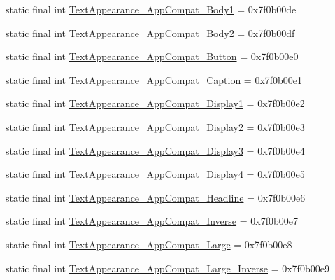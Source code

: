 \begin{CompactItemize}
\item 
static final int \hyperlink{classandroid_1_1support_1_1v7_1_1appcompat_1_1_r_1_1style_18b988d938e04ae554b3a6dcb6e4c5c8}{TextAppearance\_\-AppCompat\_\-Body1} = 0x7f0b00de
\item 
static final int \hyperlink{classandroid_1_1support_1_1v7_1_1appcompat_1_1_r_1_1style_960ce2ad432f380456d09bc9cc343480}{TextAppearance\_\-AppCompat\_\-Body2} = 0x7f0b00df
\item 
static final int \hyperlink{classandroid_1_1support_1_1v7_1_1appcompat_1_1_r_1_1style_65f6be220e2bd8dd56d1edef2449e1f1}{TextAppearance\_\-AppCompat\_\-Button} = 0x7f0b00e0
\item 
static final int \hyperlink{classandroid_1_1support_1_1v7_1_1appcompat_1_1_r_1_1style_169789ec782d3aeadbcd1aedf96d27fc}{TextAppearance\_\-AppCompat\_\-Caption} = 0x7f0b00e1
\item 
static final int \hyperlink{classandroid_1_1support_1_1v7_1_1appcompat_1_1_r_1_1style_a3b2cd207d097a2f103f44934556acff}{TextAppearance\_\-AppCompat\_\-Display1} = 0x7f0b00e2
\item 
static final int \hyperlink{classandroid_1_1support_1_1v7_1_1appcompat_1_1_r_1_1style_ee46973c484e2a0b2f1cc1bd26f35d1c}{TextAppearance\_\-AppCompat\_\-Display2} = 0x7f0b00e3
\item 
static final int \hyperlink{classandroid_1_1support_1_1v7_1_1appcompat_1_1_r_1_1style_fbc83361a2f279b07b1fc1ac1db887dc}{TextAppearance\_\-AppCompat\_\-Display3} = 0x7f0b00e4
\item 
static final int \hyperlink{classandroid_1_1support_1_1v7_1_1appcompat_1_1_r_1_1style_9c89fd6aa3594980e46ce6cde89d833b}{TextAppearance\_\-AppCompat\_\-Display4} = 0x7f0b00e5
\item 
static final int \hyperlink{classandroid_1_1support_1_1v7_1_1appcompat_1_1_r_1_1style_35918121f36dafc7c4d8365e83da9434}{TextAppearance\_\-AppCompat\_\-Headline} = 0x7f0b00e6
\item 
static final int \hyperlink{classandroid_1_1support_1_1v7_1_1appcompat_1_1_r_1_1style_95314431799de7aff7015b24dd7156c3}{TextAppearance\_\-AppCompat\_\-Inverse} = 0x7f0b00e7
\item 
static final int \hyperlink{classandroid_1_1support_1_1v7_1_1appcompat_1_1_r_1_1style_26b298cef13a474d1da6dfe1e6ff9056}{TextAppearance\_\-AppCompat\_\-Large} = 0x7f0b00e8
\item 
static final int \hyperlink{classandroid_1_1support_1_1v7_1_1appcompat_1_1_r_1_1style_65587cd87742f5c8864ceea4fcd8a995}{TextAppearance\_\-AppCompat\_\-Large\_\-Inverse} = 0x7f0b00e9

\end{CompactItemize}
